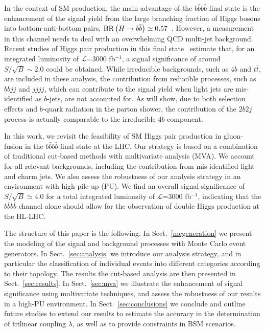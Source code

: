 In the context of SM production,
the main advantage of the $b\bar{b}b\bar{b}$ final state is the
enhancement of the signal yield
from the large branching fraction of Higgs bosons into bottom-anti-bottom
pairs, ${\rm BR}\left( H\to b\bar{b}\right)\simeq 0.57$~\cite{Dittmaier:2012vm}.
%
However, a measurement in this channel
needs to deal with an overwhelming QCD multi-jet background.
%
Recent studies of Higgs pair production in this
final state~\cite{Wardrope:2014kya,deLima:2014dta}
estimate that, for an integrated
luminosity of
$\mathcal{L}$=3000 fb$^{-1}$,
a signal significance of around $S/\sqrt{B}\sim 2.0$ could be obtained.
%
While irreducible backgrounds, such as $4b$ and
$t\bar{t}$, are included in these analysis, the contribution
from reducible processes, such as $bbjj$ and
$jjjj$, which can contribute to the signal yield when 
light jets are mis-identified as $b$-jets,
are not accounted for.
%
As will show, due to both
selection effects and $b$-quark radiation in the
parton shower, the
contribution of the $2b2j$ process is actually comparable to
the irreducible $4b$ component.

In this work, we revisit the feasibility of SM Higgs pair production in
gluon-fusion
in the $b\bar{b}b\bar{b}$ final state at the LHC.
%
 Our strategy is based on a combination of traditional cut-based
 methods with multivariate analysis (MVA).
  We account for  all relevant
  backgrounds, including the contribution from mis-identified
  light and charm jets.
  We also assess the robustness of our analysis strategy in
  an environment with high pile-up (PU).
  We find an overall signal significance of $S/\sqrt{B}\simeq 4.0$
  for a total integrated
  luminosity of $\mathcal{L}$=3000 fb$^{-1}$,
   indicating
  that the $b\bar{b}b\bar{b}$ channel
alone should allow for the observation of double Higgs production
  at the HL-LHC.
% 
  
The structure of this paper is the following.
%
In Sect.~\ref{mcgeneration} we present the modeling of the signal
and background processes with Monte Carlo event generators.
%
In Sect.~\ref{sec:analysis}
we introduce our analysis strategy, and in particular
the classification of individual events into
different categories according to their topology.
%
The results the cut-based analysis
are then presented in Sect.~\ref{sec:results}.
%
In Sect.~\ref{sec:mva} we illustrate the enhancement of signal
significance using multivariate techniques, and
assess the robustness of our results in a high-PU environment.
%
In Sect.~\ref{sec:conclusions} we conclude and outline
future studies to extend our results to estimate the accuracy
in the determination of trilinear coupling $\lambda$, as well as
to provide
 constraints in
BSM scenarios.

